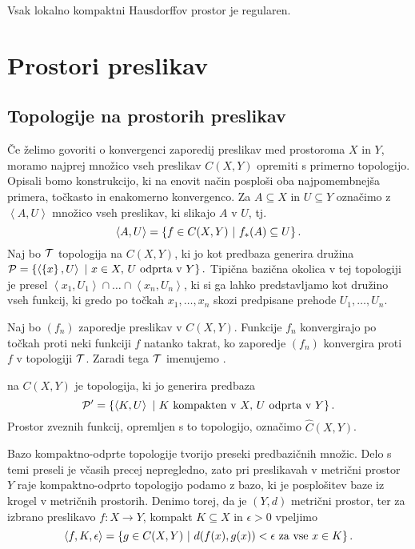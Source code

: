\begin{izrek}
    Vsak lokalno kompaktni Hausdorffov prostor je regularen.
\end{izrek}

\section{Prostori preslikav}

\subsection{Topologije na prostorih preslikav}
Če želimo govoriti o konvergenci zaporedij preslikav med prostoroma $X$ in $Y$, moramo najprej množico vseh preslikav \(C(X, Y)\) opremiti s primerno topologijo. Opisali bomo konstrukcijo, ki na enovit način posploši oba najpomembnejša primera, točkasto in enakomerno konvergenco. Za \(A \subseteq X\) in \(U \subseteq Y\) označimo z $\left\langle A, U\right\rangle$ množico vseh preslikav, ki slikajo $A$ v $U$, tj. 
$$\left\langle A, U \right\rangle = \left\{f \in C(X,Y) \ | \ f_{*}(A) \subseteq U\right\}.$$
Naj bo $\mathcal{T}$ topologija na $C(X, Y)$, ki jo kot predbaza generira družina \(\mathcal{P} = \left\{\left\langle \left\{x\right\}, U \right\rangle \ | \ x \in X, \, U \text{ odprta v } Y\right\}.\) Tipična bazična okolica v tej topologiji je presel $\left\langle x_1, U_1 \right\rangle \cap \ldots \cap \left\langle x_n, U_n \right\rangle$, ki si ga lahko predstavljamo kot družino vseh funkcij, ki gredo po točkah $x_1, \ldots, x_n$ skozi predpisane prehode $U_1, \ldots, U_n$.

\begin{trditev}
    Naj bo \((f_n)\) zaporedje preslikav v \(C(X, Y)\). Funkcije \(f_n\) konvergirajo po točkah proti neki funkciji $f$ natanko takrat, ko zaporedje \((f_n)\) konvergira proti $f$ v topologiji $\mathcal{T}$. Zaradi tega \(\mathcal{T}\) imenujemo .
\end{trditev}

\begin{definicija}
     na $C(X,Y)$ je topologija, ki jo generira predbaza \[\mathcal{P'} = \left\{\left\langle K, U \right\rangle \ | \ K \text{ kompakten v } X, \, U \text{ odprta v } Y\right\}.\]
    Prostor zveznih funkcij, opremljen s to topologijo, označimo $\widehat{C}(X,Y)$. 
\end{definicija}

Bazo kompaktno-odprte topologije tvorijo preseki predbazičnih množic. Delo s temi preseli je včasih precej nepregledno, zato pri preslikavah v metrični prostor $Y$ raje kompaktno-odprto topologijo podamo z bazo, ki je posplošitev baze iz krogel v metričnih prostorih. Denimo torej, da je $(Y, d)$ metrični prostor, ter za izbrano preslikavo $f: X \to Y$, kompakt \(K \subseteq X\) in $\epsilon > 0$ vpeljimo  
$$\left\langle f, K, \epsilon \right\rangle = \left\{g \in C(X, Y) \ | \ d(f(x), g(x)) < \epsilon \text{ za vse } x \in K\right\}.$$

